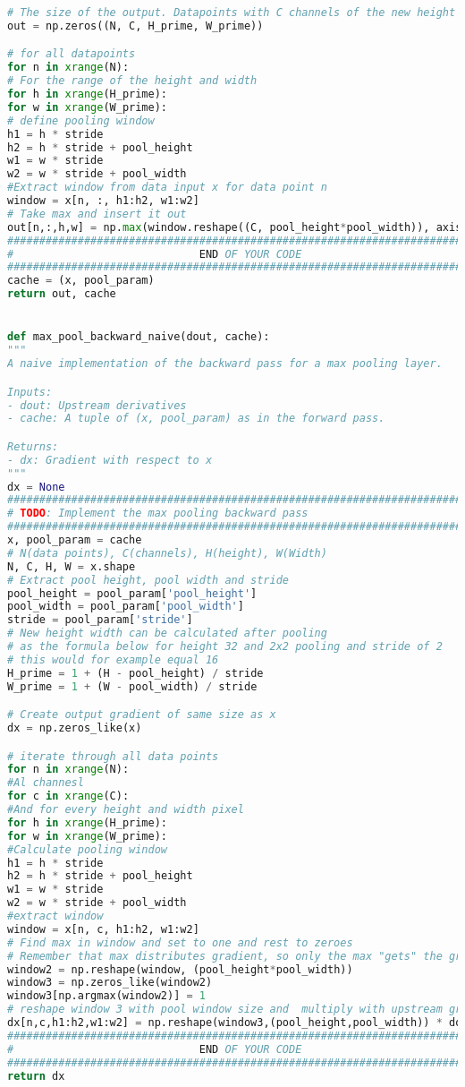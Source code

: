 \begin{lstlisting}[language=Python, label=lst:layers.py, caption={layers.py}, basicstyle=\tiny]
# The size of the output. Datapoints with C channels of the new height and width
out = np.zeros((N, C, H_prime, W_prime))

# for all datapoints
for n in xrange(N):
# For the range of the height and width
for h in xrange(H_prime):
for w in xrange(W_prime):
# define pooling window
h1 = h * stride
h2 = h * stride + pool_height
w1 = w * stride
w2 = w * stride + pool_width
#Extract window from data input x for data point n
window = x[n, :, h1:h2, w1:w2]
# Take max and insert it out
out[n,:,h,w] = np.max(window.reshape((C, pool_height*pool_width)), axis=1)
#############################################################################
#                             END OF YOUR CODE                              #
#############################################################################
cache = (x, pool_param)
return out, cache


def max_pool_backward_naive(dout, cache):
"""
A naive implementation of the backward pass for a max pooling layer.

Inputs:
- dout: Upstream derivatives
- cache: A tuple of (x, pool_param) as in the forward pass.

Returns:
- dx: Gradient with respect to x
"""
dx = None
#############################################################################
# TODO: Implement the max pooling backward pass                             #
#############################################################################
x, pool_param = cache
# N(data points), C(channels), H(height), W(Width)
N, C, H, W = x.shape
# Extract pool height, pool width and stride
pool_height = pool_param['pool_height']
pool_width = pool_param['pool_width']
stride = pool_param['stride']
# New height width can be calculated after pooling
# as the formula below for height 32 and 2x2 pooling and stride of 2 
# this would for example equal 16
H_prime = 1 + (H - pool_height) / stride
W_prime = 1 + (W - pool_width) / stride

# Create output gradient of same size as x
dx = np.zeros_like(x)

# iterate through all data points
for n in xrange(N):
#Al channesl
for c in xrange(C):
#And for every height and width pixel
for h in xrange(H_prime):
for w in xrange(W_prime):
#Calculate pooling window
h1 = h * stride
h2 = h * stride + pool_height
w1 = w * stride
w2 = w * stride + pool_width
#extract window
window = x[n, c, h1:h2, w1:w2]
# Find max in window and set to one and rest to zeroes
# Remember that max distributes gradient, so only the max "gets" the gradient
window2 = np.reshape(window, (pool_height*pool_width))
window3 = np.zeros_like(window2)
window3[np.argmax(window2)] = 1
# reshape window 3 with pool window size and  multiply with upstream gradient
dx[n,c,h1:h2,w1:w2] = np.reshape(window3,(pool_height,pool_width)) * dout[n,c,h,w]
#############################################################################
#                             END OF YOUR CODE                              #
#############################################################################
return dx



\end{lstlisting}
